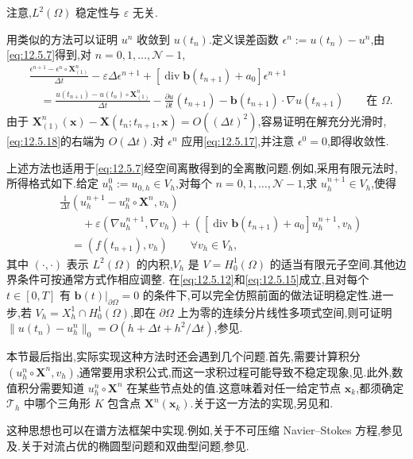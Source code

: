 注意,\(L^2(\Omega)\) 稳定性与 \(\varepsilon\) 无关.

用类似的方法可以证明 \(u^n\) 收敛到 \(u(t_n)\).定义误差函数 \(\epsilon^n:=u(t_n)-u^n\),由\eqref{eq:12.5.7}得到,对 \(n=0,1,\ldots,\mathcal N-1\),
\begin{equation}\label{eq:12.5.18}
  \begin{aligned}
    &\frac{\epsilon^{n+1}-\epsilon^n\circ\boldsymbol{X}_{(1)}^n}{\Delta t}
      -\varepsilon\Delta\epsilon^{n+1}
      +[\operatorname{div}\boldsymbol{b}(t_{n+1})+a_0]\epsilon^{n+1}\\
    &\quad=\frac{u(t_{n+1})-u(t_n)\circ\boldsymbol{X}_{(1)}^n}{\Delta t}
      -\frac{\partial u}{\partial t}(t_{n+1})
      -\boldsymbol{b}(t_{n+1})\cdot\nabla u(t_{n+1})\qquad\text{在 }\Omega.
  \end{aligned}
\end{equation}
由于 \(\boldsymbol{X}_{(1)}^n(\boldsymbol{x})-\boldsymbol{X}(t_n;t_{n+1},\boldsymbol{x})=O((\Delta t)^2)\),容易证明在解充分光滑时,\eqref{eq:12.5.18}的右端为 \(O(\Delta t)\).对 \(\epsilon^n\) 应用\eqref{eq:12.5.17},并注意 \(\epsilon^0=0\),即得收敛性.

上述方法也适用于\eqref{eq:12.5.7}经空间离散得到的全离散问题.例如,采用有限元法时,所得格式如下.给定 \(u_h^0:=u_{0,h}\in V_h\),对每个 \(n=0,1,\ldots,\mathcal N-1\),求 \(u_h^{n+1}\in V_h\),使得
\begin{equation}\label{eq:12.5.19}
  \begin{aligned}
    &\frac1{\Delta t}(u_h^{n+1}-u_h^n\circ\boldsymbol{X}^n,v_h)\\
    &\qquad+\varepsilon(\nabla u_h^{n+1},\nabla v_h)
           +([\operatorname{div}\boldsymbol{b}(t_{n+1})+a_0]u_h^{n+1},v_h)\\
    &\quad=(f(t_{n+1}),v_h)\qquad\forall v_h\in V_h,
  \end{aligned}
\end{equation}
其中 \((\cdot,\cdot)\) 表示 \(L^2(\Omega)\) 的内积,\(V_h\) 是 \(V=H_0^1(\Omega)\) 的适当有限元子空间.其他边界条件可按通常方式作相应调整.
在\eqref{eq:12.5.12}和\eqref{eq:12.5.15}成立,且对每个 \(t\in[0,T]\) 有 \(\boldsymbol{b}(t)|_{\partial\Omega}=0\) 的条件下,可以完全仿照前面的做法证明稳定性.进一步,若 \(V_h=X_h^1\cap H_0^1(\Omega)\),即在 \(\partial\Omega\) 上为零的连续分片线性多项式空间,则可证明 \(\|u(t_n)-u_h^n\|_0=O(h+\Delta t+h^2/\Delta t)\),参见.

本节最后指出,实际实现这种方法时还会遇到几个问题.首先,需要计算积分 \((u_h^n\circ\boldsymbol{X}^n,v_h)\),通常要用求积公式,而这一求积过程可能导致不稳定现象,见.此外,数值积分需要知道 \(u_h^n\circ\boldsymbol{X}^n\) 在某些节点处的值.这意味着对任一给定节点 \(\boldsymbol{x}_k\),都须确定 \(\mathcal T_h\) 中哪个三角形 \(K\) 包含点 \(\boldsymbol{X}^n(\boldsymbol{x}_k)\).关于这一方法的实现,另见和.

这种思想也可以在谱方法框架中实现.例如,关于不可压缩 Navier--Stokes 方程,参见及.关于对流占优的椭圆型问题和双曲型问题,参见.
